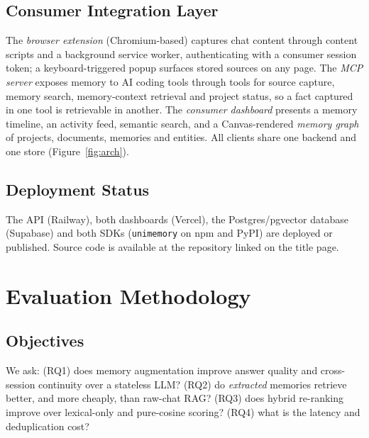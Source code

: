 \documentclass[conference]{IEEEtran}
\begin{document}
\subsection{Consumer Integration Layer}
The \emph{browser extension} (Chromium-based) captures chat content through
content scripts and a background service worker, authenticating with a consumer
session token; a keyboard-triggered popup surfaces stored sources on any page.
The \emph{MCP server} exposes memory to AI coding tools through tools for source
capture, memory search, memory-context retrieval and project status, so a fact
captured in one tool is retrievable in another. The \emph{consumer dashboard}
presents a memory timeline, an activity feed, semantic search, and a
Canvas-rendered \emph{memory graph} of projects, documents, memories and
entities. All clients share one backend and one store (Figure~\ref{fig:arch}).





\subsection{Deployment Status}
The API (Railway), both dashboards (Vercel), the Postgres/pgvector database
(Supabase) and both SDKs (\texttt{unimemory} on npm and PyPI) are deployed or
published. Source code is available at the repository linked on the title page.

\section{Evaluation Methodology}\label{sec:method}
\subsection{Objectives}
We ask: (RQ1) does memory augmentation improve answer quality and cross-session
continuity over a stateless LLM? (RQ2) do \emph{extracted} memories retrieve
better, and more cheaply, than raw-chat RAG? (RQ3) does hybrid re-ranking
improve over lexical-only and pure-cosine scoring? (RQ4) what is the latency and deduplication
cost?
\end{document}
